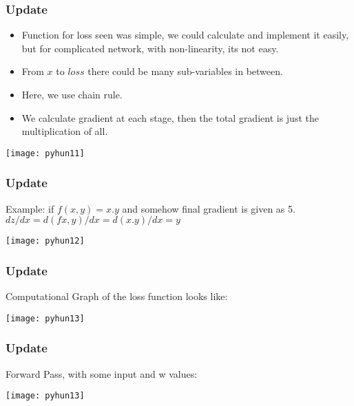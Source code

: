 \begin{frame}[fragile] \frametitle{Update}
\begin{itemize}
\item Function for loss seen was simple, we could calculate and implement it easily, but for complicated network, with non-linearity, its not easy.
\item From $x$ to $loss$ there could be many sub-variables in between.
\item Here, we use chain rule. 
\item We calculate gradient at each stage, then the total gradient is just the multiplication of all.
\end{itemize}

\begin{center}
\texttt{[image: pyhun11]}
\end{center}


\end{frame}

\begin{frame}[fragile] \frametitle{Update}
Example: if $f(x,y) = x.y$ and somehow final gradient is given as 5.
$dz/dx = d(fx,y)/dx = d(x.y)/dx = y$ 

\begin{center}
\texttt{[image: pyhun12]}
\end{center}


\end{frame}

\begin{frame}[fragile] \frametitle{Update}
Computational Graph of the loss function looks like:

\begin{center}
\texttt{[image: pyhun13]}
\end{center}


\end{frame}

\begin{frame}[fragile] \frametitle{Update}
Forward Pass, with some input and w values:

\begin{center}
\texttt{[image: pyhun13]}
\end{center}


\end{frame}

